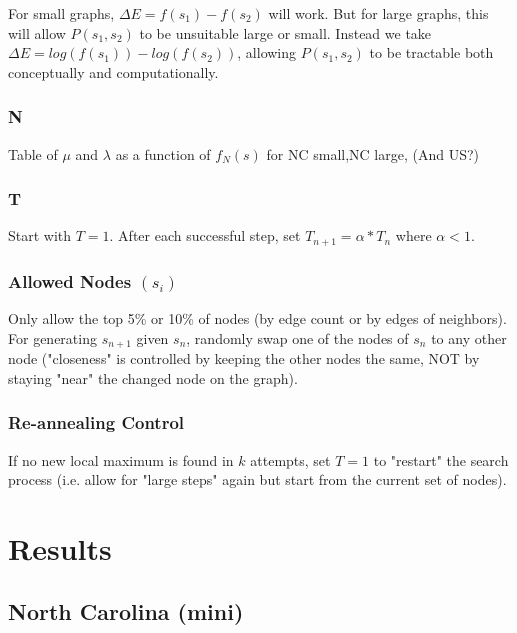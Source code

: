 \documentclass{article}
\begin{document}
	For small graphs, $\Delta E = f(s_1) - f(s_2)$ will work. But for large graphs, this will allow $P(s_1,s_2)$ to be unsuitable large or small. Instead we take $\Delta E = log(f(s_1)) - log(f(s_2))$, allowing $P(s_1,s_2)$ to be tractable both conceptually and computationally.
	
	\subsubsection{N}
	
	Table of $\mu$ and $\lambda$ as a function of $f_N(s)$ for NC small,NC large, (And US?)
	
	\subsubsection{T}
	
	Start with $T = 1$. After each successful step, set $T_{n+1} = \alpha*T_n$ where $\alpha < 1$.

	\subsubsection{Allowed Nodes $(s_i)$}
	
	Only allow the top 5\% or 10\% of nodes (by edge count or by edges of neighbors). For generating $s_{n+1}$ given $s_n$, randomly swap one of the nodes of $s_n$ to any other node ("closeness" is controlled by keeping the other nodes the same, NOT by staying "near" the changed node on the graph).
	
	\subsubsection{Re-annealing Control}

	If no new local maximum is found in $k$  attempts, set $T = 1$ to "restart" the search process (i.e. allow for "large steps" again but start from the current set of nodes).
	
	\section{Results}
	\subsection{North Carolina (mini)}
	
\end{document}
